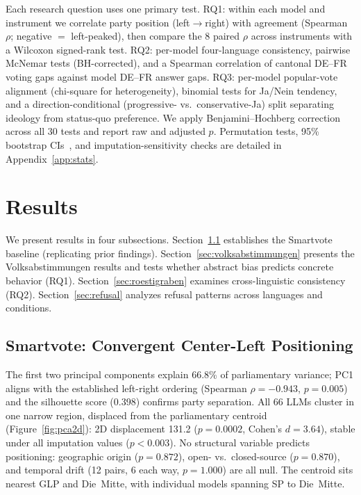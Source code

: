 \documentclass[11pt]{article}
\begin{document}
Each research question uses one primary test.
RQ1: within each model and instrument we correlate party position (left$\to$right) with agreement (Spearman $\rho$; negative $=$ left-peaked), then compare the 8 paired $\rho$ across instruments with a Wilcoxon signed-rank test.
RQ2: per-model four-language consistency, pairwise McNemar tests (BH-corrected), and a Spearman correlation of cantonal DE--FR voting gaps against model DE--FR answer gaps.
RQ3: per-model popular-vote alignment (chi-square for heterogeneity), binomial tests for Ja/Nein tendency, and a direction-conditional (progressive- vs.\ conservative-Ja) split separating ideology from status-quo preference.
We apply Benjamini--Hochberg correction~\citep{benjamini1995controlling} across all 30 tests and report raw and adjusted $p$.
Permutation tests, 95\% bootstrap CIs~\citep{efron1993bootstrap}, and imputation-sensitivity checks are detailed in Appendix~\ref{app:stats}.

\section{Results}

We present results in four subsections.
Section~\ref{sec:smartvote} establishes the Smartvote baseline (replicating prior findings).
Section~\ref{sec:volksabstimmungen} presents the Volksabstimmungen results and tests whether abstract bias predicts concrete behavior (RQ1).
Section~\ref{sec:roestigraben} examines cross-linguistic consistency (RQ2).
Section~\ref{sec:refusal} analyzes refusal patterns across languages and conditions.

\subsection{Smartvote: Convergent Center-Left Positioning}
\label{sec:smartvote}

The first two principal components explain 66.8\% of parliamentary variance; PC1 aligns with the established left-right ordering (Spearman $\rho = -0.943$, $p = 0.005$) and the silhouette score (0.398) confirms party separation.
All 66 LLMs cluster in one narrow region, displaced from the parliamentary centroid (Figure~\ref{fig:pca2d}): 2D displacement 131.2 ($p = 0.0002$, Cohen's $d = 3.64$), stable under all imputation values ($p < 0.003$).
No structural variable predicts positioning: geographic origin ($p = 0.872$), open- vs.\ closed-source ($p = 0.870$), and temporal drift (12 pairs, 6 each way, $p = 1.000$) are all null.
The centroid sits nearest GLP and Die~Mitte, with individual models spanning SP to Die~Mitte.
\end{document}
